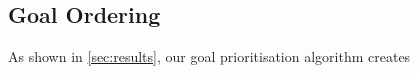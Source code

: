 \subsection{Goal Ordering}
\label{subsec:disc_goal_ordering}

As shown in \cref{sec:results}, our goal prioritisation algorithm creates